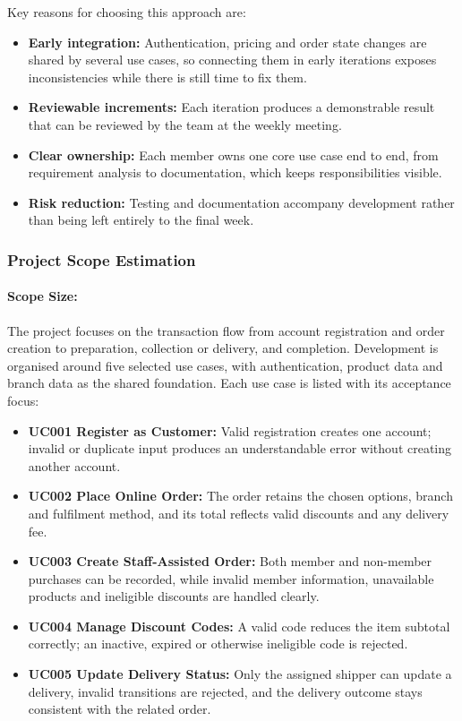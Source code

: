 Key reasons for choosing this approach are:

\begin{itemize}
  \item \textbf{Early integration:} Authentication, pricing and order state changes are shared by several use cases, so connecting them in early iterations exposes inconsistencies while there is still time to fix them.
  \item \textbf{Reviewable increments:} Each iteration produces a demonstrable result that can be reviewed by the team at the weekly meeting.
  \item \textbf{Clear ownership:} Each member owns one core use case end to end, from requirement analysis to documentation, which keeps responsibilities visible.
  \item \textbf{Risk reduction:} Testing and documentation accompany development rather than being left entirely to the final week.
\end{itemize}

\subsubsection{Project Scope Estimation}

\paragraph{Scope Size:} The project focuses on the transaction flow from account registration and order creation to preparation, collection or delivery, and completion. Development is organised around five selected use cases, with authentication, product data and branch data as the shared foundation. Each use case is listed with its acceptance focus:

\begin{itemize}
  \item \textbf{UC001 Register as Customer:} Valid registration creates one account; invalid or duplicate input produces an understandable error without creating another account.
  \item \textbf{UC002 Place Online Order:} The order retains the chosen options, branch and fulfilment method, and its total reflects valid discounts and any delivery fee.
  \item \textbf{UC003 Create Staff-Assisted Order:} Both member and non-member purchases can be recorded, while invalid member information, unavailable products and ineligible discounts are handled clearly.
  \item \textbf{UC004 Manage Discount Codes:} A valid code reduces the item subtotal correctly; an inactive, expired or otherwise ineligible code is rejected.
  \item \textbf{UC005 Update Delivery Status:} Only the assigned shipper can update a delivery, invalid transitions are rejected, and the delivery outcome stays consistent with the related order.
\end{itemize}

